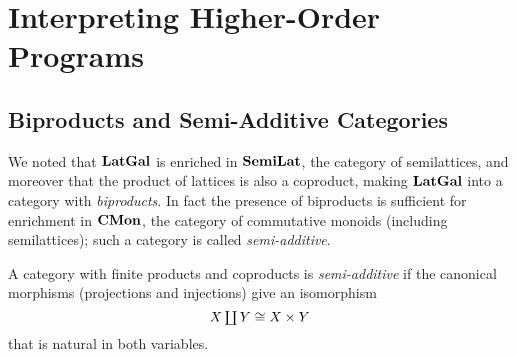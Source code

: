 \section{Interpreting Higher-Order Programs}
\label{sec:higher-order}


\subsection{Biproducts and Semi-Additive Categories}
\label{sec:biproducts}

We noted that $\mathbf{LatGal}$ is enriched in $\mathbf{SemiLat}$, the category of semilattices, and moreover that the product
of lattices is also a coproduct, making $\mathbf{LatGal}$ into a category with \emph{biproducts}. In fact the presence
of biproducts is sufficient for enrichment in $\mathbf{CMon}$, the category of commutative monoids (including
semilattices); such a category is called \emph{semi-additive}.

\begin{definition}
\label{def:biproducts:semi-additive}
A category with finite products and coproducts is \emph{semi-additive} if the canonical morphisms (projections
and injections) give an isomorphism
\[\textstyle X \coprod Y \cong X \times Y\] that is natural in both variables.
\end{definition}

